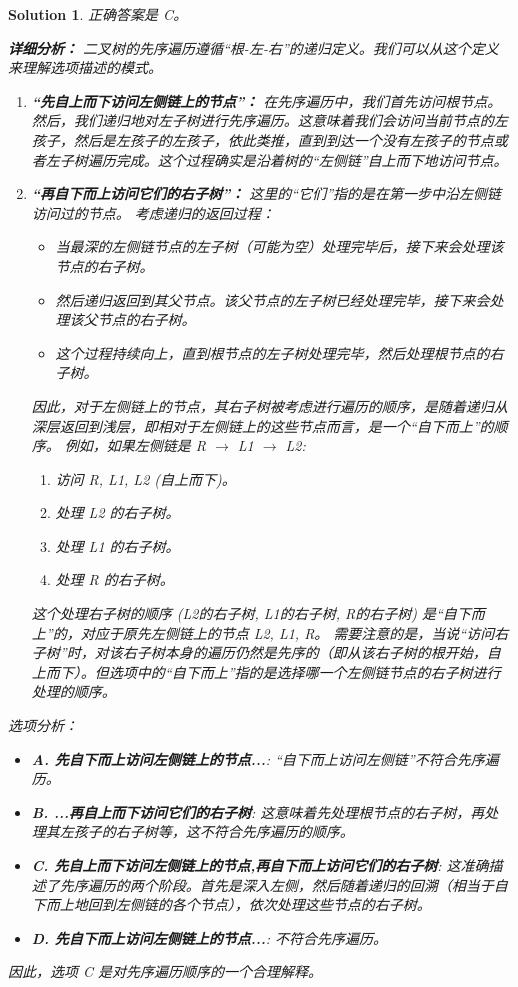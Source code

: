 \documentclass[UTF8]{report}
\newtheorem{solution}{Solution}
\theoremstyle{MyLineTheoremStyle} %
\theoremstyle{MyBlockTheoremStyle} %
\theoremstyle{MySubsubsectionStyle} %
\begin{document}
\begin{solution}
正确答案是 C。

\textbf{详细分析：}
二叉树的先序遍历遵循“根-左-右”的递归定义。我们可以从这个定义来理解选项描述的模式。

\begin{enumerate}
    \item \textbf{“先自上而下访问左侧链上的节点”：}
    在先序遍历中，我们首先访问根节点。然后，我们递归地对左子树进行先序遍历。这意味着我们会访问当前节点的左孩子，然后是左孩子的左孩子，依此类推，直到到达一个没有左孩子的节点或者左子树遍历完成。这个过程确实是沿着树的“左侧链”自上而下地访问节点。

    \item \textbf{“再自下而上访问它们的右子树”：}
    这里的“它们”指的是在第一步中沿左侧链访问过的节点。
    考虑递归的返回过程：
    \begin{itemize}
        \item 当最深的左侧链节点的左子树（可能为空）处理完毕后，接下来会处理该节点的右子树。
        \item 然后递归返回到其父节点。该父节点的左子树已经处理完毕，接下来会处理该父节点的右子树。
        \item 这个过程持续向上，直到根节点的左子树处理完毕，然后处理根节点的右子树。
    \end{itemize}
    因此，对于左侧链上的节点，其右子树被考虑进行遍历的顺序，是随着递归从深层返回到浅层，即相对于左侧链上的这些节点而言，是一个“自下而上”的顺序。
    例如，如果左侧链是 R $\rightarrow$ L1 $\rightarrow$ L2:
    \begin{enumerate}
        \item 访问 R, L1, L2 (自上而下)。
        \item 处理 L2 的右子树。
        \item 处理 L1 的右子树。
        \item 处理 R 的右子树。
    \end{enumerate}
    这个处理右子树的顺序 (L2的右子树, L1的右子树, R的右子树) 是“自下而上”的，对应于原先左侧链上的节点 L2, L1, R。
    需要注意的是，当说“访问右子树”时，对该右子树本身的遍历仍然是先序的（即从该右子树的根开始，自上而下）。但选项中的“自下而上”指的是选择哪一个左侧链节点的右子树进行处理的顺序。
\end{enumerate}

选项分析：
\begin{itemize}
    \item \textbf{A. 先自下而上访问左侧链上的节点...}: “自下而上访问左侧链”不符合先序遍历。
    \item \textbf{B. ...再自上而下访问它们的右子树}: 这意味着先处理根节点的右子树，再处理其左孩子的右子树等，这不符合先序遍历的顺序。
    \item \textbf{C. 先自上而下访问左侧链上的节点,再自下而上访问它们的右子树}: 这准确描述了先序遍历的两个阶段。首先是深入左侧，然后随着递归的回溯（相当于自下而上地回到左侧链的各个节点），依次处理这些节点的右子树。
    \item \textbf{D. 先自下而上访问左侧链上的节点...}: 不符合先序遍历。
\end{itemize}

因此，选项 C 是对先序遍历顺序的一个合理解释。
\end{solution}
\end{document}
